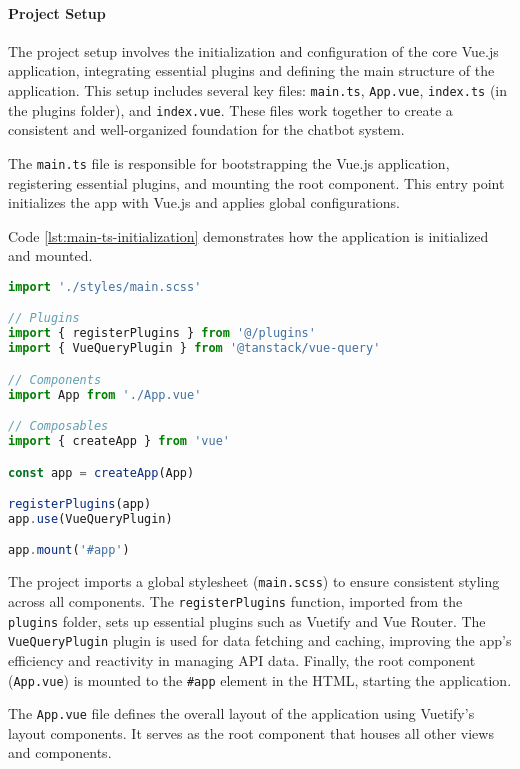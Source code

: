 \paragraph{Project Setup}%

The project setup involves the initialization and configuration of the core Vue.js application, integrating essential
plugins and defining the main structure of the application. This setup includes several key files: \texttt{main.ts},
\texttt{App.vue}, \texttt{index.ts} (in the plugins folder), and \texttt{index.vue}. These files work together to create
a consistent and well-organized foundation for the chatbot system.

The \texttt{main.ts}
file is responsible for bootstrapping the Vue.js application, registering essential plugins, and mounting the root
component. This entry point initializes the app with Vue.js and applies global configurations.

Code \ref{lst:main-ts-initialization} demonstrates how the application is initialized and mounted.

\begin{lstlisting}[language=JavaScript, caption={Bootstrapping the Application (\texttt{main.ts})},
  firstnumber=6,label={lst:main-ts-initialization}]
import './styles/main.scss'

// Plugins
import { registerPlugins } from '@/plugins'
import { VueQueryPlugin } from '@tanstack/vue-query'

// Components
import App from './App.vue'

// Composables
import { createApp } from 'vue'

const app = createApp(App)

registerPlugins(app)
app.use(VueQueryPlugin)

app.mount('#app')
\end{lstlisting}

The project imports a global stylesheet (\texttt{main.scss}) to ensure consistent styling across
all components. The \texttt{registerPlugins} function, imported from the \texttt{plugins} folder, sets up
essential plugins such as Vuetify and Vue Router. The \texttt{VueQueryPlugin} plugin is used for data fetching and
caching, improving the app’s efficiency and reactivity in managing API data. Finally, the root component
(\texttt{App.vue}) is mounted to the \texttt{\#app} element in the HTML, starting the application.

The \texttt{App.vue} file defines the overall layout of the application using Vuetify’s layout components.
It serves as the root component that houses all other views and components.

